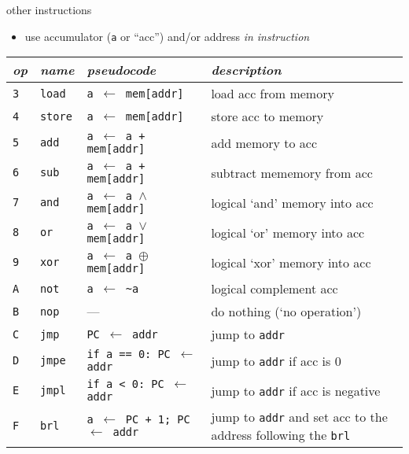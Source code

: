 \begin{frame}{other instructions}
    \vspace{-.5cm}
    \begin{itemize}
        \item use accumulator ({\tt a} or ``acc'') and/or address \textit{in instruction}
    \end{itemize}
    \small
    \begin{tabular}{l|l|l|p{6cm}}
        \textit{op} & \textit{name} &  \textit{pseudocode} & \textit{description} \\ \hline
        {\tt 3} & {\tt load} & {\tt a $\leftarrow$ mem[addr]} & load acc from memory\\ \hline
        {\tt 4} & {\tt store} & {\tt a $\leftarrow$ mem[addr]} & store acc to memory \\ \hline
        {\tt 5} & {\tt add} & {\tt a $\leftarrow$ a + mem[addr]} & add memory to acc \\ \hline
        {\tt 6} & {\tt sub} & {\tt a $\leftarrow$ a + mem[addr]} & subtract mememory from acc \\ \hline
        {\tt 7} & {\tt and} & {\tt a $\leftarrow$ a $\wedge$ mem[addr]} & logical `and' memory into acc \\ \hline
        {\tt 8} & {\tt or} & {\tt a $\leftarrow$ a $\vee$ mem[addr]} & logical `or' memory into acc \\ \hline
        {\tt 9} & {\tt xor} & {\tt a $\leftarrow$ a $\oplus$ mem[addr]} & logical `xor' memory into acc \\ \hline
        {\tt A} & {\tt not} & {\tt a $\leftarrow$ \textasciitilde a} & logical complement acc \\ \hline
        {\tt B} & {\tt nop} & --- & do nothing (`no operation') \\ \hline
        {\tt C} & {\tt jmp} & {\tt PC $\leftarrow$ addr} & jump to \texttt{addr} \\ \hline
        {\tt D} & {\tt jmpe} & {\tt if a == 0: PC $\leftarrow$ addr} & jump to \texttt{addr} if acc is 0 \\ \hline
        {\tt E} & {\tt jmpl} & {\tt if a < 0: PC $\leftarrow$ addr} & jump to \texttt{addr} if acc is negative \\ \hline
        {\tt F} & {\tt brl} & {\tt a $\leftarrow$ PC + 1; PC $\leftarrow$ addr} & jump to \texttt{addr} and set acc to
                                                             the address following the {\tt brl} \\ \hline
    \end{tabular}
\end{frame}

